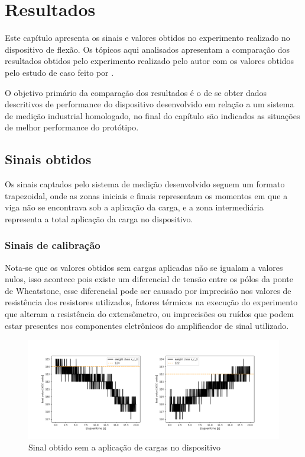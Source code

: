 
\chapter{Resultados}

Este capítulo apresenta os sinais e valores obtidos no experimento realizado no dispositivo de flexão. Os tópicos aqui analisados apresentam a comparação dos resultados
obtidos pelo experimento realizado pelo autor com os valores obtidos pelo estudo de caso feito por \autocite{Minela2017}.

O objetivo primário da comparação dos resultados é o de se obter dados descritivos de performance do dispositivo desenvolvido em relação a um sistema de medição industrial
homologado, no final do capítulo são indicados as situações de melhor performance do protótipo.

\section{Sinais obtidos}

Os sinais captados pelo sistema de medição desenvolvido seguem um formato trapezoidal, onde as zonas iniciais e finais representam os momentos em que a viga não se encontrava
sob a aplicação da carga, e a zona intermediária representa a total aplicação da carga no dispositivo.

\subsection{Sinais de calibração}

Nota-se que os valores obtidos sem cargas aplicadas não se igualam a valores nulos, isso acontece pois existe um diferencial de tensão entre os pólos da ponte de Wheatstone,
esse diferencial pode ser causado por imprecisão nos valores de resistência dos resistores utilizados, fatores térmicos na execução do experimento que alteram a resistência
do extensômetro, ou imprecisões ou ruídos que podem estar presentes nos componentes eletrônicos do amplificador de sinal utilizado.

\begin{figure}[htb]
	\caption{\label{fig:410} Sinal obtido sem a aplicação de cargas no dispositivo}
	\begin{center}
		\includegraphics[width=\textwidth]{pictures/x_cal_0.png}
	\end{center}
\end{figure}

